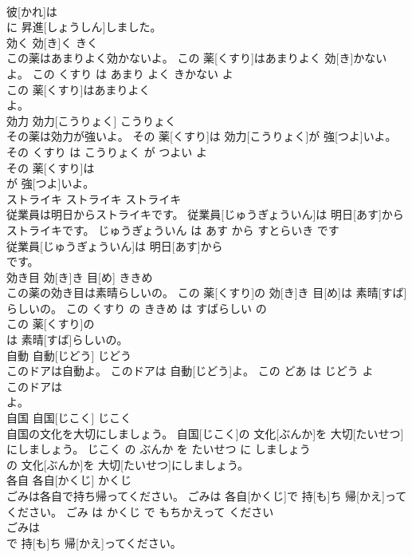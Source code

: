 \documentclass[8pt]{extreport}
\begin{document}
\begin{CJK}{UTF8}{min}
\\	彼[かれ]は
\\	に 昇進[しょうしん]しました。			
\\	効く	効[き]く	きく	
\\	この薬はあまりよく効かないよ。	この 薬[くすり]はあまりよく 効[き]かないよ。	この くすり は あまり よく きかない よ	
\\	この 薬[くすり]はあまりよく
\\	よ。			
\\	効力	効力[こうりょく]	こうりょく	
\\	その薬は効力が強いよ。	その 薬[くすり]は 効力[こうりょく]が 強[つよ]いよ。	その くすり は こうりょく が つよい よ	
\\	その 薬[くすり]は
\\	が 強[つよ]いよ。			
\\	ストライキ	ストライキ	ストライキ	
\\	従業員は明日からストライキです。	従業員[じゅうぎょういん]は 明日[あす]からストライキです。	じゅうぎょういん は あす から すとらいき です	
\\	従業員[じゅうぎょういん]は 明日[あす]から
\\	です。			
\\	効き目	効[き]き 目[め]	ききめ	
\\	この薬の効き目は素晴らしいの。	この 薬[くすり]の 効[き]き 目[め]は 素晴[すば]らしいの。	この くすり の ききめ は すばらしい の	
\\	この 薬[くすり]の
\\	は 素晴[すば]らしいの。			
\\	自動	自動[じどう]	じどう	
\\	このドアは自動よ。	このドアは 自動[じどう]よ。	この どあ は じどう よ	
\\	このドアは
\\	よ。			
\\	自国	自国[じこく]	じこく	
\\	自国の文化を大切にしましょう。	自国[じこく]の 文化[ぶんか]を 大切[たいせつ]にしましょう。	じこく の ぶんか を たいせつ に しましょう	
\\	の 文化[ぶんか]を 大切[たいせつ]にしましょう。			
\\	各自	各自[かくじ]	かくじ	
\\	ごみは各自で持ち帰ってください。	ごみは 各自[かくじ]で 持[も]ち 帰[かえ]ってください。	ごみ は かくじ で もちかえって ください	
\\	ごみは
\\	で 持[も]ち 帰[かえ]ってください。			

\end{CJK}
\end{document}
